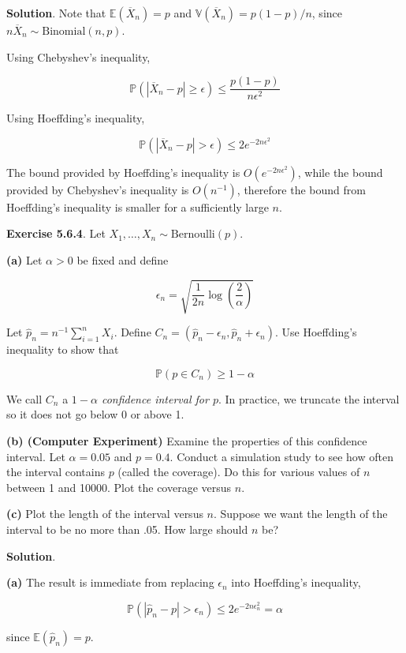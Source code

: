 \textbf{Solution}. Note that \(\mathbb{E}(\overline{X}_{n}) = p\) and
\(\mathbb{V}(\overline{X}_{n}) = p(1-p) / n\), since
\(n \overline{X}_{n} \sim \text{Binomial}(n, p)\).

Using Chebyshev's inequality,

\[ \mathbb{P}(|\overline{X}_{n} - p| \geq \epsilon) \leq \frac{p(1 - p)}{n \epsilon^{2}} \]

Using Hoeffding's inequality,

\[ \mathbb{P}(|\overline{X}_{n} - p| > \epsilon) \leq 2e^{-2n\epsilon^{2}} \]

The bound provided by Hoeffding's inequality is
\(O(e^{-2n\epsilon^{2}})\), while the bound provided by Chebyshev's
inequality is \(O(n^{-1})\), therefore the bound from Hoeffding's
inequality is smaller for a sufficiently large \(n\).

\textbf{Exercise 5.6.4}. Let
\(X_{1}, \dots, X_{n} \sim \text{Bernoulli}(p)\).

\textbf{(a)} Let \(\alpha > 0\) be fixed and define

\[ \epsilon_{n} = \sqrt{\frac{1}{2n} \log \left( \frac{2}{\alpha}\right)} \]

Let \(\hat{p}_{n} = n^{-1} \sum_{i=1}^{n} X_{i}\). Define
\(C_{n} = (\hat{p}_{n} - \epsilon_{n}, \hat{p}_{n} + \epsilon_{n})\). Use
Hoeffding's inequality to show that

\[ \mathbb{P}(p \in C_{n}) \geq 1 - \alpha \]

We call \(C_{n}\) a \emph{\(1 - \alpha\) confidence interval for \(p\)}.
In practice, we truncate the interval so it does not go below 0 or above
1.

\textbf{(b) (Computer Experiment)} Examine the properties of this
confidence interval. Let \(\alpha = 0.05\) and \(p = 0.4\). Conduct a
simulation study to see how often the interval contains \(p\) (called
the coverage). Do this for various values of \(n\) between 1 and 10000.
Plot the coverage versus \(n\).

\textbf{(c)} Plot the length of the interval versus \(n\). Suppose we
want the length of the interval to be no more than .05. How large should
\(n\) be?

\textbf{Solution}.

\textbf{(a)} The result is immediate from replacing \(\epsilon_{n}\) into
Hoeffding's inequality,

\[ \mathbb{P}(|\hat{p}_{n} - p| > \epsilon_{n}) \leq 2e^{-2n\epsilon_{n}^{2}} = \alpha \]

since \(\mathbb{E}(\hat{p}_{n}) = p\).

